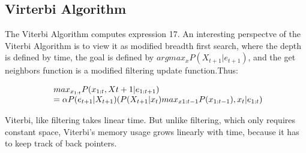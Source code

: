 \documentclass[a4paper]{article}
\begin{document}
\subsection{Virterbi Algorithm}

The Viterbi Algorithm computes expression 17. An interesting perspectve of the Viterbi Algorithm is to view it as modified breadth first search, where the depth is defined by time,  the goal is defined by $argmax_x P(X_{t+1}|e_{t+1})$, and the get neighbors function is a modified filtering update function.Thus:

\begin{equation}
\begin{array}{l@{}l}
max_{x_{1:t}} P(x_{1:t},X{t+1}|e_{1:t+1})\\
= \alpha P(e_{t+1}|X_{t+1})(P(X_{t+1}|x_t)max_{x1:t-1}P(x_{1:t-1}), x_t|e_{1:t}) 
\end{array}
\end{equation}

Viterbi, like filtering takes linear time. But unlike filtering, which only requires constant space, Viterbi's memory usage grows linearly with time, because it has to keep track of back pointers.
\end{document}

